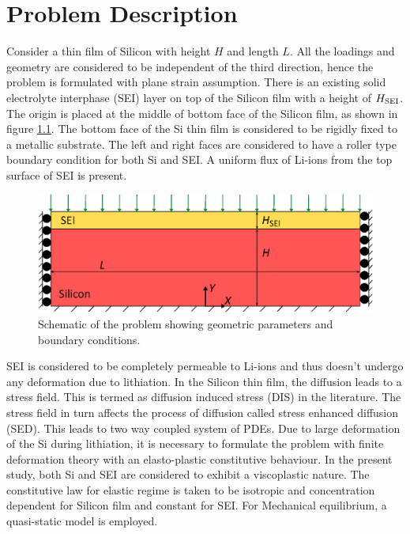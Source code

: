 \chapter{Problem Description}
Consider a thin film of Silicon with height $H$ and length $L$. All the loadings and geometry are considered to be independent of the third direction, hence the problem is formulated with plane strain assumption. There is an existing solid electrolyte interphase (SEI) layer on top of the Silicon film with a height of $H_{\rm{SEI}}$. The origin is placed at the middle of bottom face of the Silicon film, as shown in figure \ref{fig:probDesc}. The bottom face of the Si thin film is considered to be rigidly fixed to a metallic substrate. The left and right faces are considered to have a roller type boundary condition for both Si and SEI. A uniform flux of Li-ions from the top surface of SEI is present. 
\begin{figure}[H]
    \centering
    \includegraphics[width=\textwidth]{figures/probDescFigs/drawing.eps}
    \caption{Schematic of the problem showing geometric parameters and boundary conditions.}
    \label{fig:probDesc}
\end{figure}
SEI is considered to be completely permeable to Li-ions and thus doesn't undergo any deformation due to lithiation. In the Silicon thin film, the diffusion leads to a stress field. This is termed as diffusion induced stress (DIS) in the literature. The stress field in turn affects the process of diffusion called stress enhanced diffusion (SED). This leads to two way coupled system of PDEs.
Due to large deformation of the Si during lithiation, it is necessary to formulate the problem with finite deformation theory with an elasto-plastic constitutive behaviour. In the present study, both Si and SEI are considered to exhibit a viscoplastic nature. The constitutive law for elastic regime is taken to be isotropic and concentration dependent for Silicon film and constant for SEI. 
For Mechanical equilibrium, a quasi-static model is employed.